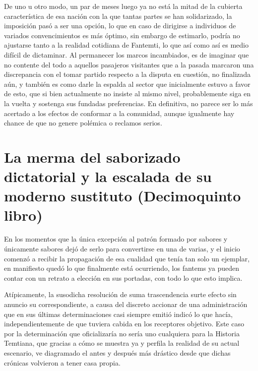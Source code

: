 \documentclass[
]{book}
\begin{document}
De uno u otro modo, un par de meses luego ya no está la mitad de la cubierta característica de esa nación con la que tantas partes se han solidarizado, la imposición pasó a ser una opción, lo que en caso de dirigirse a individuos de variados convencimientos es más óptimo, sin embargo de estimarlo, podría no ajustarse tanto a la realidad cotidiana de Fantemti, lo que así como así es medio difícil de dictaminar. Al permanecer los marcos incambiados, es de imaginar que no contente del todo a aquellos pasajeros visitantes que a la pasada marcaron una discrepancia con el tomar partido respecto a la disputa en cuestión, no finalizada aún, y también es como darle la espalda al sector que inicialmente estuvo a favor de esto, que si bien actualmente no insiste al mismo nivel, probablemente siga en la vuelta y sostenga sus fundadas preferencias. En definitiva, no parece ser lo más acertado a los efectos de conformar a la comunidad, aunque igualmente hay chance de que no genere polémica o reclamos serios.

\hypertarget{la-merma-del-saborizado-dictatorial-y-la-escalada-de-su-moderno-sustituto-decimoquinto-libro}{%
\chapter{La merma del saborizado dictatorial y la escalada de su moderno sustituto (Decimoquinto libro)}\label{la-merma-del-saborizado-dictatorial-y-la-escalada-de-su-moderno-sustituto-decimoquinto-libro}}

En los momentos que la única excepción al patrón formado por sabores y únicamente sabores dejó de serlo para convertirse en una de varias, y el inicio comenzó a recibir la propagación de esa cualidad que tenía tan solo un ejemplar, en manifiesto quedó lo que finalmente está ocurriendo, los fantems ya pueden contar con un retrato a elección en sus portadas, con todo lo que esto implica.

Atípicamente, la susodicha resolución de suma trascendencia surte efecto sin anuncio su correspondiente, a causa del discreto accionar de una administración que en sus últimas determinaciones casi siempre emitió indicó lo que hacía, independientemente de que tuviera cabida en los receptores objetivo. Este caso por la determinación que oficializaría no sería uno cualquiera para la Historia Temtiana, que gracias a cómo se muestra ya y perfila la realidad de su actual escenario, ve diagramado el antes y después más drástico desde que dichas crónicas volvieron a tener casa propia.
\end{document}
